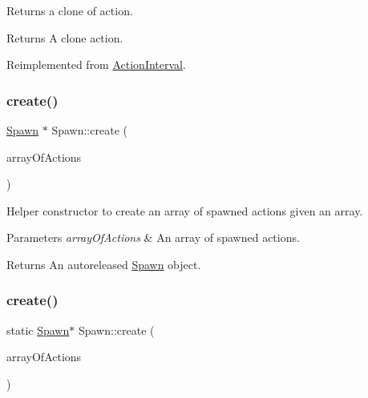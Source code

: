 Returns a clone of action.

\begin{DoxyReturn}{Returns}
A clone action. 
\end{DoxyReturn}


Reimplemented from \hyperlink{classActionInterval_abc93ce0c2f54a90eb216a7803f25f44a}{Action\+Interval}.

\mbox{\label{classSpawn_a0d1dac3657853dc578bb1b3fb14df6d5}} 
\subsubsection{\texorpdfstring{create()}{create()}\hspace{0.1cm}{\footnotesize\ttfamily [1/2]}}
{\footnotesize\ttfamily \hyperlink{classSpawn}{Spawn} $\ast$ Spawn\+::create (\begin{DoxyParamCaption}\item[{const \hyperlink{classVector}{Vector}$<$ \hyperlink{classFiniteTimeAction}{Finite\+Time\+Action} $\ast$$>$ \&}]{array\+Of\+Actions }\end{DoxyParamCaption})\hspace{0.3cm}{\ttfamily [static]}}

Helper constructor to create an array of spawned actions given an array.


\begin{DoxyParams}{Parameters}
{\em array\+Of\+Actions} & An array of spawned actions. \\
\hline
\end{DoxyParams}
\begin{DoxyReturn}{Returns}
An autoreleased \hyperlink{classSpawn}{Spawn} object. 
\end{DoxyReturn}
\mbox{\label{classSpawn_a91b85fc8d0c31ff67f406792363c624a}} 
\subsubsection{\texorpdfstring{create()}{create()}\hspace{0.1cm}{\footnotesize\ttfamily [2/2]}}
{\footnotesize\ttfamily static \hyperlink{classSpawn}{Spawn}$\ast$ Spawn\+::create (\begin{DoxyParamCaption}\item[{const \hyperlink{classVector}{Vector}$<$ \hyperlink{classFiniteTimeAction}{Finite\+Time\+Action} $\ast$$>$ \&}]{array\+Of\+Actions }\end{DoxyParamCaption})\hspace{0.3cm}{\ttfamily [static]}}

